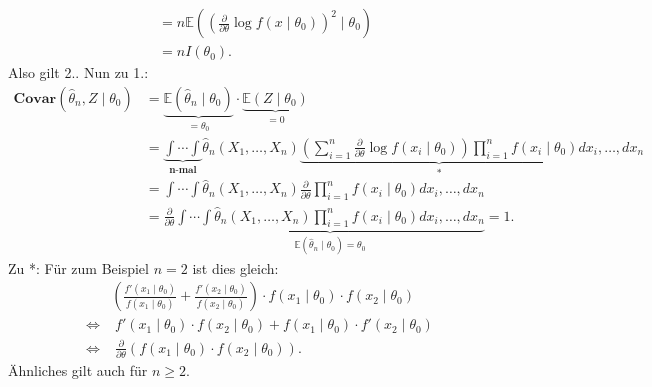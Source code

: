 \documentclass[10pt]{article}
\newcommand{\FZV}{X_1, \ldots, X_n} %
\newcommand{\EW}{\mathbb{E}} %
\newcommand{\ablt}{\frac{\partial}{\partial \theta}}
\newenvironment{BWS}[1][]
{\begin{Beweis}[frametitle=#1]}{\end{Beweis}}
\begin{document}
\begin{BWS}[Beweis 1.4.1 (Effizienz)]
\begin{equation*}
\begin{split}
				&= n\EW((\ablt \log f(x \mid \theta_0))^2 \mid \theta_0)\\
				&= nI(\theta_0).
			\end{split}
		\end{equation*}
		Also gilt 2.. Nun zu 1.:
		\begin{equation*}
			\begin{split}
				\textbf{Covar}(\hat{\theta}_n, Z \mid \theta_0) &= \underbrace{\EW(\hat{\theta}_n \mid \theta_0)}_{= \theta_0} \cdot \underbrace{\EW(Z \mid \theta_0)}_{= 0}\\
				&= \underbrace{\int \cdots \int}_{\textbf{n-mal}}\hat{\theta}_n(\FZV) \underbrace{(\sum_{i=1}^{n}\ablt \log f(x_i \mid \theta_0)) \prod_{i=1}^{n}f(x_i \mid \theta_0)}_{*} dx_i, \ldots, dx_n\\
				&= \int \cdots \int \hat{\theta}_n (\FZV) \ablt \prod_{i=1}^{n} f(x_i \mid \theta_0) dx_i, \ldots, dx_n\\
				&= \ablt \underbrace{\int \cdots \int \hat{\theta}_n(\FZV) \prod_{i=1}^{n} f(x_i \mid \theta_0) dx_i, \ldots, dx_n}_{\EW(\hat{\theta}_n \mid \theta_0) = \theta_0} = 1.
			\end{split}
		\end{equation*}
		Zu *: Für zum Beispiel $n=2$ ist dies gleich:
		\begin{equation*}
			\begin{split}
				&\left(\frac{f'(x_1 \mid \theta_0)}{f(x_1 \mid \theta_0)} + \frac{f'(x_2 \mid \theta_0)}{f(x_2 \mid \theta_0)}\right) \cdot f(x_1 \mid \theta_0) \cdot f(x_2 \mid \theta_0)\\
				\Leftrightarrow & \;f'(x_1 \mid \theta_0) \cdot f(x_2 \mid \theta_0) + f(x_1 \mid \theta_0) \cdot f'(x_2 \mid \theta_0)\\
				\Leftrightarrow & \;\ablt (f(x_1 \mid \theta_0) \cdot f(x_2 \mid \theta_0)).
			\end{split}
		\end{equation*}
		Ähnliches gilt auch für $n \geq 2$.
	\end{BWS}
	
\end{document}
